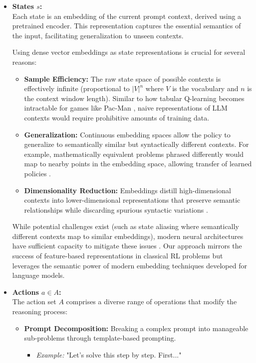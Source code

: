 \documentclass[10pt,journal,compsoc]{IEEEtran}
\begin{document}
\begin{itemize}
\item
  \textbf{States \(s\):}\\
  Each state is an embedding of the current prompt context, derived
  using a pretrained encoder. This representation captures the essential
  semantics of the input, facilitating generalization to unseen
  contexts. 
  
  Using dense vector embeddings as state representations is crucial for several reasons:
  \begin{itemize}
    \item \textbf{Sample Efficiency:} The raw state space of possible contexts is effectively infinite (proportional to $|V|^n$ where $V$ is the vocabulary and $n$ is the context window length). Similar to how tabular Q-learning becomes intractable for games like Pac-Man \citep{mnih2013playing}, naive representations of LLM contexts would require prohibitive amounts of training data.
    
    \item \textbf{Generalization:} Continuous embedding spaces allow the policy to generalize to semantically similar but syntactically different contexts. For example, mathematically equivalent problems phrased differently would map to nearby points in the embedding space, allowing transfer of learned policies \citep{bengio2013representation}.
    
    \item \textbf{Dimensionality Reduction:} Embeddings distill high-dimensional contexts into lower-dimensional representations that preserve semantic relationships while discarding spurious syntactic variations \citep{mikolov2013distributed}.
  \end{itemize}
  
  While potential challenges exist (such as state aliasing where semantically different contexts map to similar embeddings), modern neural architectures have sufficient capacity to mitigate these issues \citep{arora2019theoretical}. Our approach mirrors the success of feature-based representations in classical RL problems \citep{sutton2018reinforcement} but leverages the semantic power of modern embedding techniques developed for language models.
\item
  \textbf{Actions \(a \in A\):}\\
  The action set \(A\) comprises a diverse range of operations that modify the reasoning process:

  \begin{itemize}
  \item
    \textbf{Prompt Decomposition:} Breaking a complex prompt into
    manageable sub-problems through template-based prompting.
    \begin{itemize}
    \item \textit{Example:} "Let's solve this step by step. First..."
    \end{itemize}
    

\end{itemize}
\end{itemize}
\end{document}
